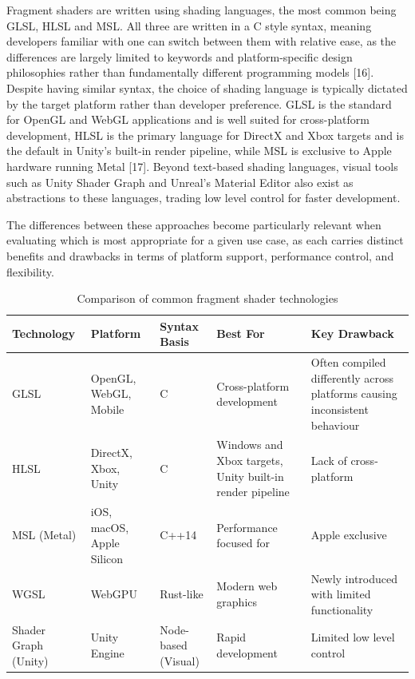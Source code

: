 \documentclass[]{final_report}
\begin{document}
Fragment shaders are written using shading languages, the most common being GLSL, HLSL and MSL. All three are written in a C style syntax, meaning developers familiar with one can switch between them with relative ease, as the differences are largely limited to keywords and platform-specific design philosophies rather than fundamentally different programming models [16]. Despite having similar syntax, the choice of shading language is typically dictated by the target platform rather than developer preference. GLSL is the standard for OpenGL and WebGL applications and is well suited for cross-platform development, HLSL is the primary language for DirectX and Xbox targets and is the default in Unity's built-in render pipeline, while MSL is exclusive to Apple hardware running Metal [17]. Beyond text-based shading languages, visual tools such as Unity Shader Graph and Unreal's Material Editor also exist as abstractions to these languages, trading low level control for faster development.

The differences between these approaches become particularly relevant when evaluating which is most appropriate for a given use case, as each carries distinct benefits and drawbacks in terms of platform support, performance control, and flexibility.

\begin{table}[h]
	\centering
	\renewcommand{\arraystretch}{1.4}
	\begin{tabular}{|p{2.5cm}|p{2.5cm}|p{2cm}|p{3.5cm}|p{3.5cm}|}
		\hline
		\textbf{Technology} & \textbf{Platform} & \textbf{Syntax Basis} & \textbf{Best For} & \textbf{Key Drawback} \\
		\hline
		GLSL & OpenGL, WebGL, Mobile & C & Cross-platform development & Often compiled differently across platforms causing inconsistent behaviour \\
		\hline
		HLSL & DirectX, Xbox, Unity & C & Windows and Xbox targets, Unity built-in render pipeline & Lack of cross-platform \\
		\hline
		MSL (Metal) & iOS, macOS, Apple Silicon & C++14 & Performance focused for  & Apple exclusive \\
		\hline
		WGSL & WebGPU & Rust-like & Modern web graphics & Newly introduced with limited functionality \\
		\hline
		Shader Graph (Unity) & Unity Engine & Node-based (Visual) & Rapid development & Limited low level control \\
		\hline
	\end{tabular}
	\caption{Comparison of common fragment shader technologies}
	\label{tab:shader_comparison}
\end{table}
\end{document}
